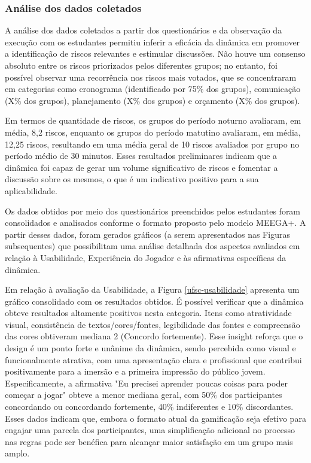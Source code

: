 \documentclass[
	12pt,
	openright,
	twoside,
	a4paper,
	english,
	brazil
	]{abntex2}
\begin{document}
\subsubsection{Análise dos dados coletados}

A análise dos dados coletados a partir dos questionários e da observação da execução com os estudantes permitiu inferir a eficácia da dinâmica em promover a identificação de riscos relevantes e estimular discussões. Não houve um consenso absoluto entre os riscos priorizados pelos diferentes grupos; no entanto, foi possível observar uma recorrência nos riscos mais votados, que se concentraram em categorias como cronograma (identificado por 75\% dos grupos), comunicação (X\% dos grupos), planejamento (X\% dos grupos) e orçamento (X\% dos grupos).

Em termos de quantidade de riscos, os grupos do período noturno avaliaram, em média, 8,2 riscos, enquanto os grupos do período matutino avaliaram, em média, 12,25 riscos, resultando em uma média geral de 10 riscos avaliados por grupo no período médio de 30 minutos. Esses resultados preliminares indicam que a dinâmica foi capaz de gerar um volume significativo de riscos e fomentar a discussão sobre os mesmos, o que é um indicativo positivo para a sua aplicabilidade.

Os dados obtidos por meio dos questionários preenchidos pelos estudantes foram consolidados e analisados conforme o formato proposto pelo modelo MEEGA+. A partir desses dados, foram gerados gráficos (a serem apresentados nas Figuras subsequentes) que possibilitam uma análise detalhada dos aspectos avaliados em relação à Usabilidade, Experiência do Jogador e às afirmativas específicas da dinâmica.

Em relação à avaliação da Usabilidade, a Figura \ref{ufsc-usabilidade} apresenta um gráfico consolidado com os resultados obtidos. É possível verificar que a dinâmica obteve resultados altamente positivos nesta categoria. Itens como atratividade visual, consistência de textos/cores/fontes, legibilidade das fontes e compreensão das cores obtiveram mediana 2 (Concordo fortemente). Esse insight reforça que o design é um ponto forte e unânime da dinâmica, sendo percebida como visual e funcionalmente atrativa, com uma apresentação clara e profissional que contribui positivamente para a imersão e a primeira impressão do público jovem. Especificamente, a afirmativa "Eu precisei aprender poucas coisas para poder começar a jogar" obteve a menor mediana geral, com 50\% dos participantes concordando ou concordando fortemente, 40\% indiferentes e 10\% discordantes. Esses dados indicam que, embora o formato atual da gamificação seja efetivo para engajar uma parcela dos participantes, uma simplificação adicional no processo nas regras pode ser benéfica para alcançar maior satisfação em um grupo mais amplo.
\end{document}
